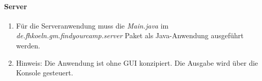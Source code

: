 \paragraph{Server}

\begin{enumerate}
	\item Für die Serveranwendung muss die \textit{Main.java} im \textit{de.fhkoeln.gm.findyourcamp.server} Paket als Java-Anwendung ausgeführt werden.
	\item Hinweis: Die Anwendung ist ohne GUI konzipiert. Die Ausgabe wird über die Konsole gesteuert.
\end{enumerate}
